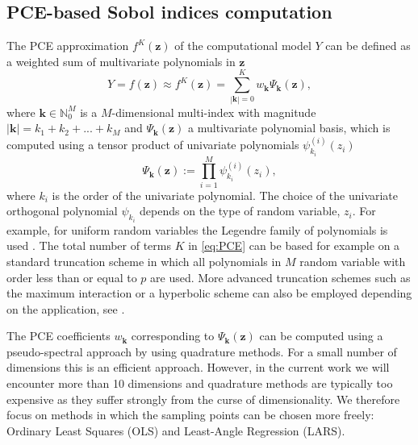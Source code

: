 \subsection{PCE-based Sobol indices computation}
The PCE approximation $f^{K}(\mathbf{z})$ of the computational model $Y$ can be defined as a weighted sum of multivariate polynomials in $\mathbf{z}$ \cite{RSmith}
\begin{equation}\label{eq:PCE}
Y= f(\mathbf{z}) \approx f^{K}(\mathbf{z}) = \sum_{|\mathbf{k}| = 0}^K w_{\mathbf{k}}\Psi_{\mathbf{k}}(\mathbf{z}),
\end{equation}
where $\mathbf{k}\in \mathbb{N}_0^M$ is a $M$-dimensional multi-index with magnitude $|\mathbf{k}| = k_1+k_2 + ... + k_M$ and $\Psi_{\mathbf{k}}(\mathbf{z})$ a multivariate polynomial basis, which is computed using a tensor product of univariate polynomials $\psi_{k_i}^{(i)}(z_i)$
\begin{equation}
\Psi_{\mathbf{k}}(\mathbf{z}) := \prod_{i=1}^M\psi_{k_i}^{(i)}(z_i),
\end{equation}
where $k_i$ is the order of the univariate polynomial. The choice of the univariate orthogonal polynomial $\psi_{k_i}$ depends on the type of random variable, $z_i$. For example, for uniform random variables the Legendre family of polynomials is used \cite{Xiu2002}. 
The total number of terms $K$ in \eqref{eq:PCE} can be based for example on a standard truncation scheme in which all polynomials in $M$ random variable with order less than or equal to $p$ are used. More advanced truncation schemes such as the maximum interaction or a hyperbolic scheme can also be employed depending on the application, see \cite{BlatmanThesis}. 

The PCE coefficients $w_{\mathbf{k}}$ corresponding to $\Psi_{\mathbf{k}}(\mathbf{z})$ can be computed using a pseudo-spectral approach by using quadrature methods. For a small number of dimensions this is an efficient approach. However, in the current work we will encounter more than 10 dimensions and quadrature methods are typically too expensive as they suffer strongly from the curse of dimensionality. We therefore focus on methods in which the sampling points can be chosen more freely: Ordinary Least Squares (OLS) and Least-Angle Regression (LARS).

